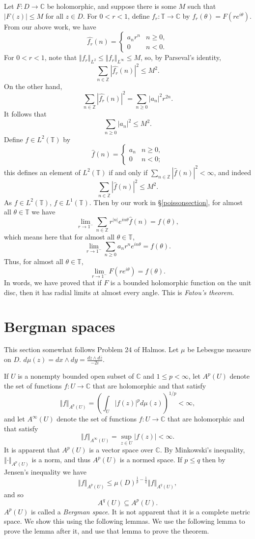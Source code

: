 \documentclass{article}
\newcommand{\norm}[1]{\left\Vert #1 \right\Vert}
\begin{document}
Let $F:D \to \mathbb{C}$ be holomorphic, and suppose there is some $M$ such that $|F(z)| \leq M$ for all $z \in D$. 
For $0<r<1$, define $f_r:\mathbb{T} \to \mathbb{C}$ by $f_r(\theta)=F(re^{i\theta})$. 
From our above work, we have 
\[
\widehat{f_r}(n)=\begin{cases}
a_n r^n&n \geq 0,\\
0&n<0.
\end{cases}
\]
For $0<r<1$, note that $\norm{f_r}_{L^2} \leq \norm{f_r}_{L^\infty} \leq M$, so, by Parseval's identity,
\[
\sum_{n \in \mathbb{Z}} |\widehat{f_r}(n)|^2  \leq M^2.
\]
On the other hand,
\[
\sum_{n \in \mathbb{Z}} |\widehat{f_r}(n)|^2= \sum_{n \geq 0} |a_n|^2 r^{2n}.
\]
It follows that
\[
\sum_{n \geq 0} |a_n|^2 \leq M^2.
\]
Define $f \in L^2(\mathbb{T})$ by
\[
\hat{f}(n)=\begin{cases}
a_n&n \geq 0,\\
0&n<0;
\end{cases}
\]
 this  defines an element of $L^2(\mathbb{T})$ if and only if $\sum_{n \in \mathbb{Z}} |\hat{f}(n)|^2< \infty$, and indeed
 \[
 \sum_{n \in \mathbb{Z}} |\hat{f}(n)|^2 \leq M^2.
 \]
 As $f \in L^2(\mathbb{T})$, $f \in L^1(\mathbb{T})$.  Then
 by our work in \S \ref{poissonsection}, for almost all $\theta \in \mathbb{T}$ we have
 \[
 \lim_{r \to 1^-} \sum_{n \in \mathbb{Z}}  r^{|n|} e^{in\theta}\hat{f}(n) = f(\theta),
 \]
 which  means here that for almost all $\theta \in \mathbb{T}$,
 \[
 \lim_{r \to 1^-} \sum_{n \geq 0} a_n r^n e^{in\theta} = f(\theta).
 \]
Thus, for almost all $\theta \in \mathbb{T}$,
\[
\lim_{r \to 1^-} F(re^{i\theta}) = f(\theta).
\]
In words, we have proved that if $F$ is a bounded holomorphic function on the unit disc, then it has radial limits at almost every angle.
This is {\em Fatou's theorem}.


\section{Bergman spaces}
This section somewhat follows Problem 24 of Halmos.
Let $\mu$ be Lebesgue measure on $D$. $d\mu(z)=dx \wedge dy = \frac{dz \wedge d\overline{z}}{-2i}$.

If $U$ is a  nonempty bounded open subset of $\mathbb{C}$ and $1 \leq p < \infty$, let $A^p(U)$ denote the set of functions $f:U \to \mathbb{C}$ that are holomorphic and
that satisfy
\[
\norm{f}_{A^p(U)}  = \left( \int_U |f(z)|^p d\mu(z) \right)^{1/p} < \infty,
\]
and let $A^\infty(U)$ denote the set of functions $f:U \to \mathbb{C}$ that are holomorphic and that satisfy
\[
\norm{f}_{A^\infty(U)} = \sup_{z \in U} |f(z)| < \infty.
\]
It is apparent that $A^p(U)$ is a vector space over $\mathbb{C}$.
By Minkowski's inequality, $\norm{\cdot}_{A^p(U)}$  is a norm, and thus $A^p(U)$ is a normed space.
If $p \leq q$ then by Jensen's inequality we have 
\[
\norm{f}_{A^p(U)} \leq \mu(D)^{\frac{1}{p}-\frac{1}{q}} \norm{f}_{A^q(U)},
\]
and so
\[
A^q(U) \subseteq A^p(U).
\]
$A^p(U)$ is called a {\em Bergman space}. It is not apparent that it is a complete metric space. We show this using the following lemmas.
We use the following lemma to prove the lemma after it, and use that lemma to prove the theorem.
\end{document}
